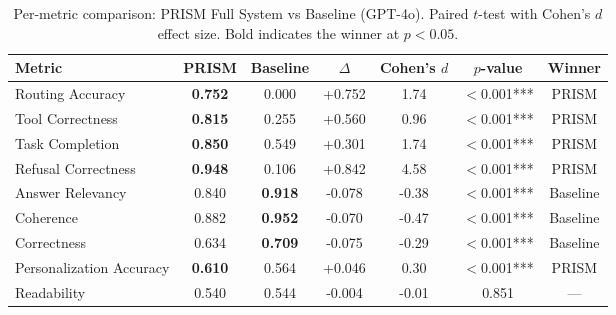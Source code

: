 \begin{table}[htbp]
\centering
\caption{Per-metric comparison: PRISM Full System vs Baseline (GPT-4o). Paired $t$-test with Cohen's $d$ effect size. Bold indicates the winner at $p < 0.05$.}
\label{tab:per_metric}
\begin{tabular}{lcccccc}
\toprule
Metric & PRISM & Baseline & $\Delta$ & Cohen's $d$ & $p$-value & Winner \\
\midrule
Routing Accuracy & \textbf{0.752} & 0.000 & +0.752 & 1.74 & $<$0.001*** & PRISM \\
Tool Correctness & \textbf{0.815} & 0.255 & +0.560 & 0.96 & $<$0.001*** & PRISM \\
Task Completion & \textbf{0.850} & 0.549 & +0.301 & 1.74 & $<$0.001*** & PRISM \\
Refusal Correctness & \textbf{0.948} & 0.106 & +0.842 & 4.58 & $<$0.001*** & PRISM \\
Answer Relevancy & 0.840 & \textbf{0.918} & -0.078 & -0.38 & $<$0.001*** & Baseline \\
Coherence & 0.882 & \textbf{0.952} & -0.070 & -0.47 & $<$0.001*** & Baseline \\
Correctness & 0.634 & \textbf{0.709} & -0.075 & -0.29 & $<$0.001*** & Baseline \\
Personalization Accuracy & \textbf{0.610} & 0.564 & +0.046 & 0.30 & $<$0.001*** & PRISM \\
Readability & 0.540 & 0.544 & -0.004 & -0.01 & 0.851 & --- \\
\bottomrule
\end{tabular}
\end{table}
